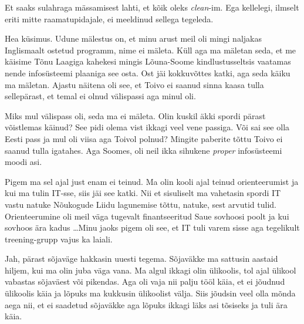 
Et saaks sulahraga mässamisest lahti, et kõik oleks \emph{clean}-im. Ega 
kellelegi, ilmselt eriti mitte raamatupidajale, ei meeldinud sellega tegeleda. 


Hea küsimus. Udune mälestus on, et minu arust meil oli mingi naljakas 
Inglismaalt ostetud programm, nime ei mäleta. Küll aga ma mäletan seda, et me 
käisime  Tõnu Laagiga kahekesi mingis Lõuna-Soome 
kindlustusseltsis vaatamas nende infosüsteemi plaaniga see osta. Ost 
jäi kokkuvõttes katki, aga seda käiku ma mäletan. Ajastu näitena oli see, 
et Toivo ei saanud sinna kaasa tulla sellepärast, et 
temal ei olnud välispassi aga minul oli.


Miks mul välispass oli, seda ma ei mäleta. Olin kuskil äkki spordi pärast 
võistlemas käinud? See pidi olema vist ikkagi veel 
vene passiga. Või sai see olla Eesti pass ja mul oli viisa aga Toivol polnud? 
Mingite paberite tõttu Toivo ei saanud tulla igatahes. Aga Soomes, oli neil 
ikka sihukene \emph{proper} infosüsteemi moodi asi. 


Pigem ma sel ajal just enam ei teinud. Ma olin kooli ajal teinud 
orienteerumist ja kui ma tulin IT-sse, siis jäi see katki. Nii et sisuliselt ma 
vahetasin  spordi IT vastu natuke Nõukogude Liidu lagunemise tõttu, natuke, 
sest arvutid tulid. Orienteerumine oli meil väga tugevalt finantseeritud Saue 
sovhoosi poolt ja kui sovhoos ära kadus \ldots Minu 
jaoks pigem oli see, et IT tuli varem sisse aga tegelikult treening-grupp vajus 
ka laiali.


Jah, pärast sõjaväge hakkasin uuesti tegema. Sõjaväkke ma sattusin aastaid 
hiljem, kui ma olin juba väga vana.  Ma algul ikkagi olin ülikoolis, tol ajal 
ülikool vabastas sõjaväest või pikendas. Aga oli vaja  nii palju tööl käia, 
et  ei jõudnud ülikoolis käia ja  lõpuks ma kukkusin  ülikoolist välja. Siis 
jõudsin veel olla mõnda aega nii, et ei saadetud sõjaväkke aga lõpuks ikkagi 
läks asi tõsiseks  ja tuli ära käia. 

